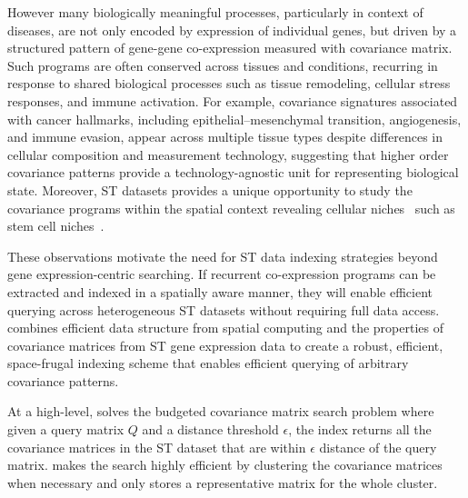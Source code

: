 \documentclass[pdflatex,sn-mathphys-num]{sn-jnl}%
\theoremstyle{thmstyleone}%
\theoremstyle{thmstyletwo}%
\theoremstyle{thmstylethree}%
\begin{document}
However many biologically meaningful processes, particularly in context of diseases, are not only encoded by expression of individual genes, but driven by a structured pattern of gene-gene co-expression measured with covariance matrix. Such programs are often conserved across tissues and conditions, recurring in response to shared biological processes such as tissue remodeling, cellular stress responses, and immune activation. For example, covariance signatures associated with cancer hallmarks, including epithelial–mesenchymal transition, angiogenesis, and immune evasion, appear across multiple tissue types despite differences in cellular composition and measurement technology, suggesting that higher order covariance patterns provide a technology-agnostic unit for representing biological state. Moreover, ST datasets provides a unique opportunity to study the covariance programs within the spatial context revealing cellular niches~\cite{haviv2025covariance} such as stem cell niches~\cite{sarkar2025deciphering}. 

These observations motivate the need for ST data indexing strategies beyond gene expression-centric searching. If recurrent co-expression programs can be extracted and indexed in a spatially aware manner, they will enable efficient querying across heterogeneous ST datasets without requiring full data access. \OurMethod combines efficient data structure from spatial computing and the properties of covariance matrices from ST gene expression data to create a robust, efficient, space-frugal indexing scheme that enables efficient querying of arbitrary covariance patterns. 

At a high-level, \OurMethod solves the budgeted covariance matrix search problem where given a query matrix $Q$ and a \logEuclid distance threshold $\epsilon$, the index returns all the covariance matrices in the ST dataset that are within $\epsilon$ \logEuclid distance of the query matrix. \OurMethod makes the search highly efficient by clustering the covariance matrices when necessary and only stores a representative matrix for the whole cluster. 
\end{document}
